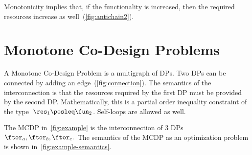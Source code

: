 \noindent Monotonicity implies that, if the functionality is increased,
then the required resources increase as well~(\cref{fig:antichain2}).


\section{Monotone Co-Design Problems \label{sec:Monotone-Co-Design-Problems}}

A Monotone Co-Design Problem is a multigraph of DPs. Two DPs can be
connected by adding an edge~(\cref{fig:connection}). The semantics
of the interconnection is that the resources required by the first
DP must be provided by the second DP. Mathematically, this is a partial
order inequality constraint of the type~$\res_{1}\posleq\fun_{2}$.
Self-loops are allowed as well.

\begin{example}
  The MCDP in~\cref{fig:example} is the interconnection of 3
  DPs $\ftor_{a},\ftor_{b},\ftor_{c}.$ The semantics of the MCDP as
  an optimization problem is shown in~\cref{fig:example-semantics}.

\end{example}

\\

